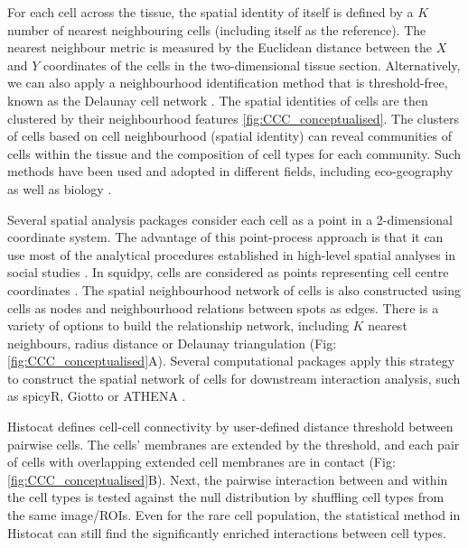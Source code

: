 For each cell across the tissue, the spatial identity of itself is defined by a $K$ number of nearest neighbouring cells (including itself as the reference). The nearest neighbour metric is measured by the Euclidean distance between the $X$ and $Y$ coordinates of the cells in the two-dimensional tissue section. Alternatively, we can also apply a neighbourhood identification method that is threshold-free, known as the Delaunay cell network \cite{guibas1985primitives, dries2021giotto, fortune1995voronoi}. The spatial identities of cells are then clustered by their neighbourhood features \ref{fig:CCC_conceptualised}. The clusters of cells based on cell neighbourhood (\ie spatial identity) can reveal communities of cells within the tissue and the composition of cell types for each community. Such methods have been used and adopted in different fields, including eco-geography as well as biology \cite{goltsev2018CODEX, dries2021giotto}.

Several spatial analysis packages consider each cell as a point in a 2-dimensional coordinate system. The advantage of this point-process approach is that it can use most of the analytical procedures established in high-level spatial analyses in social studies \cite{yushimito2012voronoi}. In squidpy, cells are considered as points representing cell centre coordinates \cite{palla2022squidpy}. The spatial neighbourhood network of cells is also constructed using cells as nodes and neighbourhood relations between spots as edges. There is a variety of options to build the relationship network, including $K$ nearest neighbours, radius distance or Delaunay triangulation (Fig: \ref{fig:CCC_conceptualised}A). Several computational packages apply this strategy to construct the spatial network of cells for downstream interaction analysis, such as spicyR, Giotto or ATHENA \cite{canete2022spicyr, dries2021giotto, martinelli2022athena}.    

Histocat defines cell-cell connectivity by user-defined distance threshold between pairwise cells.  The cells’ membranes are extended by the threshold, and each pair of cells with overlapping extended cell membranes are in contact (Fig: \ref{fig:CCC_conceptualised}B). Next, the pairwise interaction between and within the cell types is tested against the null distribution by shuffling cell types from the same image/ROIs. Even for the rare cell population, the statistical method in Histocat can still find the significantly enriched interactions between cell types.

